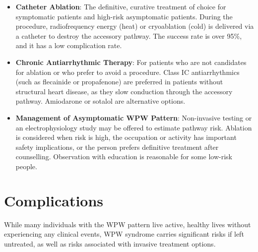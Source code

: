 \begin{itemize}
    \begin{itemize}
      \item \textbf{Catheter Ablation}: The definitive, curative treatment of choice for symptomatic patients and high-risk asymptomatic patients. During the procedure, radiofrequency energy (heat) or cryoablation (cold) is delivered via a catheter to destroy the accessory pathway. The success rate is over 95\%, and it has a low complication rate.
      \item \textbf{Chronic Antiarrhythmic Therapy}: For patients who are not candidates for ablation or who prefer to avoid a procedure. Class IC antiarrhythmics (such as flecainide or propafenone) are preferred in patients without structural heart disease, as they slow conduction through the accessory pathway. Amiodarone or sotalol are alternative options.
      \item \textbf{Management of Asymptomatic WPW Pattern}: Non-invasive testing or an electrophysiology study may be offered to estimate pathway risk. Ablation is considered when risk is high, the occupation or activity has important safety implications, or the person prefers definitive treatment after counselling. Observation with education is reasonable for some low-risk people.
    \end{itemize}
\end{itemize}

\section*{Complications}
While many individuals with the WPW pattern live active, healthy lives without experiencing any clinical events, WPW syndrome carries significant risks if left untreated, as well as risks associated with invasive treatment options.

